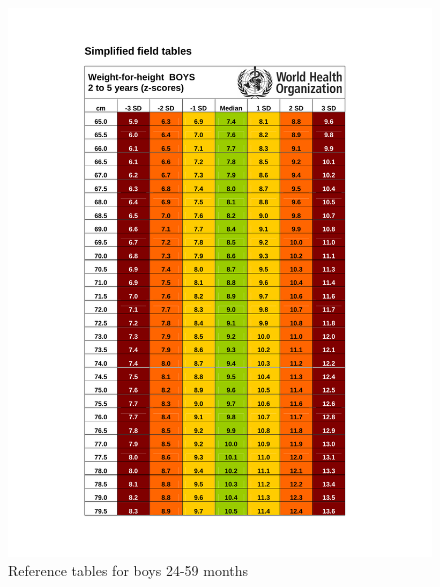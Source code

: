 \documentclass[12pt,]{book}
\theoremstyle{definition}
\theoremstyle{definition}
\theoremstyle{definition}
\theoremstyle{remark}
\begin{document}
\begin{figure}[H]
{\centering \includegraphics[width=1\linewidth]{pdf/boys_24_60} 

}

\caption{Reference tables for boys 24-59 months}\label{fig:anthro12}
\end{figure}\begin{figure}[H]


\end{figure}
\end{document}

